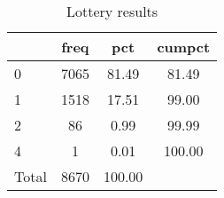 \begin{table}[htbp]\centering
\def\sym#1{\ifmmode^{#1}\else\(^{#1}\)\fi}
\caption{Lottery results}
\begin{tabular}{l*{1}{ccc}}
\toprule
                    &        freq&         pct&      cumpct\\
\midrule
0                   &        7065&       81.49&       81.49\\
1                   &        1518&       17.51&       99.00\\
2                   &          86&        0.99&       99.99\\
4                   &           1&        0.01&      100.00\\
Total               &        8670&      100.00&            \\
\bottomrule
\end{tabular}
\end{table}

